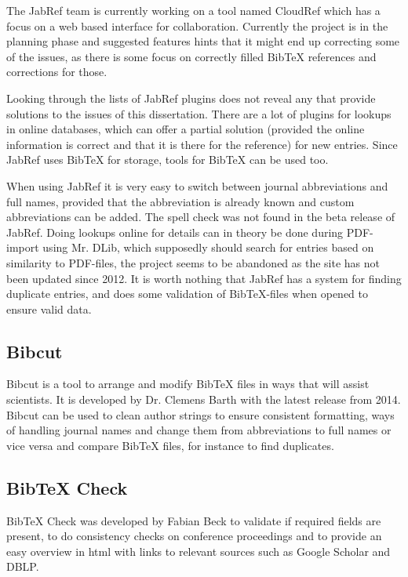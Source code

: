 The JabRef team is currently working on a tool named CloudRef which
has a focus on a web based interface for collaboration.  Currently the
project is in the planning phase and suggested features hints that it
might end up correcting some of the issues, as there is some focus on
correctly filled Bib{\TeX} references and corrections for those.

Looking through the lists of JabRef plugins does not reveal any that
provide solutions to the issues of this dissertation.  There are a lot
of plugins for lookups in online databases, which can offer a partial
solution (provided the online information is correct and that it is
there for the reference) for new entries\cite{jabref_resources}.
Since JabRef uses Bib{\TeX} for storage, tools for Bib{\TeX} can be
used too.

When using JabRef it is very easy to switch between journal
abbreviations and full names, provided that the abbreviation is
already known and custom abbreviations can be
added\cite{jabref_abbreviations}.  The spell check was not found in
the beta release of JabRef.  Doing lookups online for details can in
theory be done during PDF-import using Mr. DLib, which supposedly
should search for entries based on similarity to PDF-files, the
project seems to be abandoned as the site has not been updated since
2012\cite{jabref_mrdlib,jabref_mrdlib_notice}.  It is worth nothing
that JabRef has a system for finding duplicate entries, and does some
validation of Bib{\TeX}-files when opened to ensure valid data.


\subsection{Bibcut}
Bibcut is a tool to arrange and modify Bib{\TeX} files in ways that
will assist scientists.  It is developed by Dr. Clemens Barth with the
latest release from 2014.  Bibcut can be used to clean author strings
to ensure consistent formatting, ways of handling journal names and
change them from abbreviations to full names or vice
versa and compare Bib{\TeX} files, for instance
to find duplicates\cite{bibcut_site}.


\subsection{Bib{\TeX} Check}
Bib{\TeX} Check was developed by Fabian Beck to validate if required
fields are present, to do consistency checks on conference proceedings
and to provide an easy overview in html with links to relevant sources
such as Google Scholar and DBLP.

